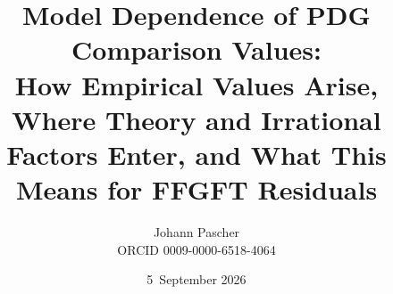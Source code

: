 \documentclass[11pt,a4paper]{report}
\title{Model Dependence of PDG Comparison Values:\\[0.5em]
  \large How Empirical Values Arise, Where Theory and Irrational Factors Enter, and What This Means for FFGFT Residuals}
\date{5~September 2026}
\author{Johann Pascher\\\small ORCID 0009-0000-6518-4064}
\begin{document}
\renewcommand{\thechapter}{}
\renewcommand{\thesection}{\arabic{section}}
\maketitle
\tableofcontents

\end{document}
